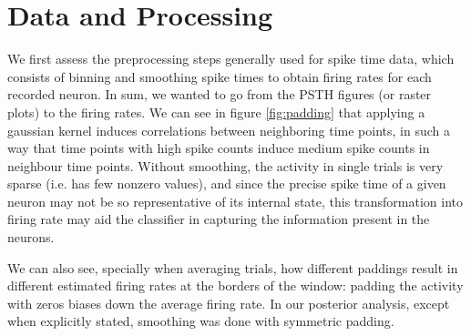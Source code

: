 \chapter{Data and Processing}

We first assess the preprocessing steps generally used for spike time data, which consists of binning and smoothing spike times to obtain firing rates for each recorded neuron. In sum, we wanted to go from the PSTH figures (or raster plots) to the firing rates. We can see in figure \ref{fig:padding} that applying a gaussian kernel induces correlations between neighboring time points, in such a way that time points with high spike counts induce medium spike counts in neighbour time points. Without smoothing, the activity in single trials is very sparse (i.e. has few nonzero values), and since the precise spike time of a given neuron may not be so representative of its internal state, this transformation into firing rate may aid the classifier in capturing the information present in the neurons.
    
    We can also see, specially when averaging trials, how different paddings result in different estimated firing rates at the borders of the window: padding the activity with zeros biases down the average firing rate. In our posterior analysis, except when explicitly stated, smoothing was done with symmetric padding.
    
